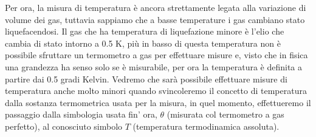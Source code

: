 \documentclass[10pt,a4paper]{article}
\begin{document}
\FloatBarrier
Per ora, la misura di temperatura è ancora strettamente legata alla variazione di volume dei gas, tuttavia sappiamo che a basse temperature i gas cambiano stato liquefacendosi. Il gas che ha temperatura di liquefazione minore è l'elio che cambia di stato intorno a 0.5 \textdegree K, più in basso di questa temperatura non è possibile sfruttare un termometro a gas per effettuare misure e, visto che in fisica una grandezza ha senso solo se è misurabile, per ora la temperatura è definita a partire dai 0.5 gradi Kelvin. Vedremo che sarà possibile effettuare misure di temperatura anche molto minori quando svincoleremo il concetto di temperatura dalla sostanza termometrica usata per la misura, in quel momento, effettueremo il passaggio dalla simbologia usata fin' ora, $\theta$ (misurata col termometro a gas perfetto), al conosciuto simbolo $T$ (temperatura termodinamica assoluta).
\end{document}
